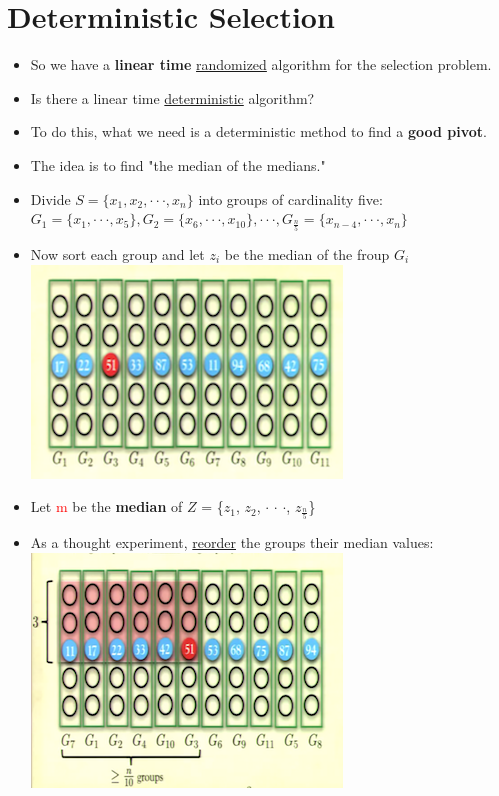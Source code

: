 \documentclass[12pt]{article}
\begin{document}
\section{Deterministic Selection}
\renewcommand{\labelitemii}{$\circ$}
\renewcommand{\labelitemiii}{$\cdot$}
\renewcommand{\labelitemiii}{$\rightarrow$}
\begin{itemize}
\item So we have a \textbf{linear time} \underline{randomized} algorithm for the selection problem.
\item Is there a linear time \underline{deterministic} algorithm?
\item To do this, what we need is a deterministic method to find a \textbf{good pivot}.
\item The idea is to find "the median of the medians."
\item Divide {\large $S = \{x_1, x_2, \cdot \cdot \cdot, x_n\}$} into groups of cardinality five:\\
{\large
$G_1 = \{x_1, \cdot \cdot \cdot, x_5\}, G_2 = \{x_6, \cdot \cdot \cdot, x_{10}\}, \cdot \cdot \cdot, G_{\frac{n}{5} } = \{x_{n-4}, \cdot \cdot \cdot, x_{n}\}$
}
\item Now sort each group and let $z_i$ be the median of the froup $G_i$\\
\includegraphics{lecture56}
\item Let \textcolor{red}{m} be the \textbf{median} of {\large $Z$ = \{$z_1$, $z_2$, $\cdot$ $\cdot$ $\cdot$, $z_{\frac{n}{5}}$\}}
\item As a thought experiment, \underline{reorder} the groups their median values:\\
\includegraphics{lecture57}

\end{itemize}
\end{document}
